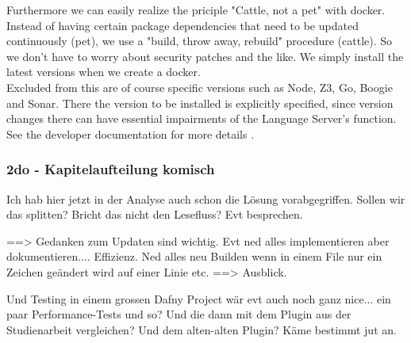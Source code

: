 Furthermore we can easily realize the priciple "Cattle, not a pet" with docker.
Instead of having certain package dependencies that need to be updated continuously (pet), we use a "build, throw away, rebuild" procedure (cattle). So we don't have to worry about security patches and the like. We simply install the latest versions when we create a docker. \\

Excluded from this are of course specific versions such as Node, Z3, Go, Boogie and Sonar.
There the version to be installed is explicitly specified, since version changes there
can have essential impairments of the Language Server's function. See the developer documentation for more details \cite{dev}. \\

\subsubsection{2do - Kapitelaufteilung komisch}
Ich hab hier jetzt in der Analyse auch schon die Lösung vorabgegriffen. Sollen wir das splitten? Bricht das nicht den Lesefluss? Evt besprechen.











==> Gedanken zum Updaten sind wichtig. Evt ned alles implementieren aber dokumentieren.... Effizienz. Ned alles neu Builden
wenn in einem File nur ein Zeichen geändert wird auf einer Linie etc. ==> Ausblick.

Und Testing in einem grossen Dafny Project wär evt auch noch ganz nice... ein paar Performance-Tests und so?
Und die dann mit dem Plugin aus der Studienarbeit vergleichen? Und dem alten-alten Plugin? Käme bestimmt jut an.